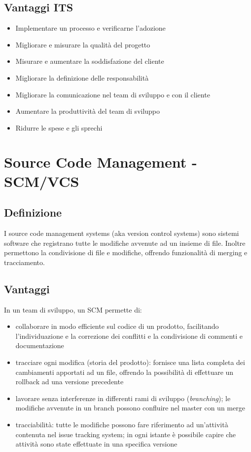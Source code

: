 \documentclass[10pt, a4paper]{article}
\begin{document}
\subsection{Vantaggi ITS}
\begin{itemize}
\item Implementare un processo e verificarne l’adozione
\item Migliorare e misurare la qualità del progetto
\item Misurare e aumentare la soddisfazione del cliente
\item Migliorare la definizione delle responsabilità
\item Migliorare la comunicazione nel team di sviluppo e con il cliente
\item Aumentare la produttività del team di sviluppo
\item Ridurre le spese e gli sprechi
\end{itemize}
\newpage
\section{Source Code Management - SCM/VCS}
\subsection{Definizione}
I source code management systems (aka version control systems) sono sistemi software che registrano tutte le modifiche avvenute ad un insieme di file. Inoltre permettono la condivisione di file e modifiche, offrendo funzionalità di merging e tracciamento.

\subsection{Vantaggi}
In un team di sviluppo, un SCM permette di:
\begin{itemize}
\item collaborare in modo efficiente sul codice di un prodotto, facilitando l'individuazione e la correzione dei conflitti e la condivisione di commenti e documentazione
\item tracciare ogni modifica (storia del prodotto): fornisce una lista completa dei cambiamenti apportati ad un file, offrendo la possibilità di effettuare un rollback ad una versione precedente
\item lavorare senza interferenze in differenti rami di sviluppo (\textit{branching}); le modifiche avvenute in un branch possono confluire nel master con un merge
\item tracciabilità: tutte le modifiche possono fare riferimento ad un'attività contenuta nel issue tracking system; in ogni istante è possibile capire che attività sono state effettuate in una specifica versione
\end{itemize}
\end{document}
